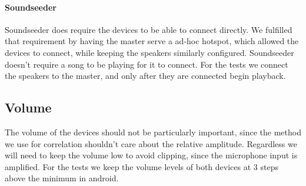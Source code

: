 \paragraph{Soundseeder}
Soundseeder does require the devices to be able to connect directly. We
fulfilled that requirement by having the master serve a ad-hoc hotspot,
which allowed the devices to connect, while keeping the speakers
similarly configured. Soundseeder doesn't require a song to be playing
for it to connect. For the tests we connect the speakers to the master,
and only after they are connected begin playback.

\subsection{Volume}
The volume of the devices should not be particularly important, since
the method we use for correlation shouldn't care about the relative
amplitude. Regardless we will need to keep the volume low to avoid
clipping, since the microphone input is amplified. For the tests we keep
the volume levels of both devices at 3 steps above the minimum in
android.

